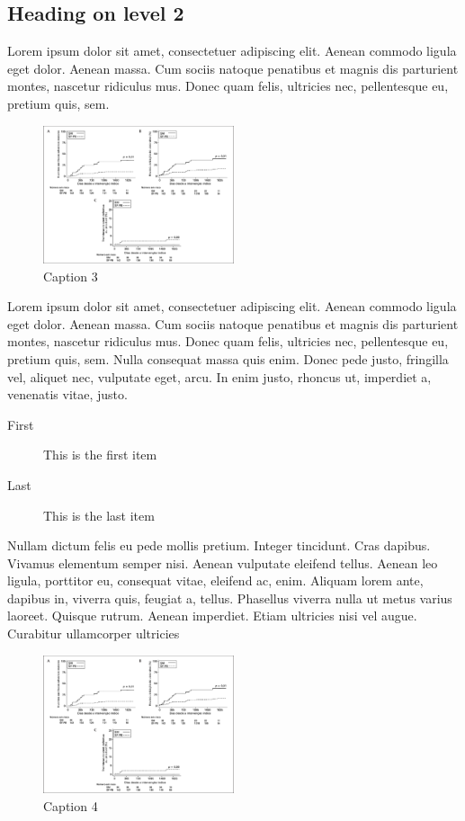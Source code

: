 \subsection*{Heading on level 2}
Lorem ipsum dolor sit amet, consectetuer adipiscing elit. Aenean commodo ligula
eget dolor. Aenean massa. Cum sociis natoque penatibus et magnis dis parturient
montes, nascetur ridiculus mus. Donec quam felis, ultricies nec, pellentesque
eu, pretium quis, sem. 

\par
\begin{figure}[p]
	\centering
	\includegraphics[width=0.5\textwidth]{temp.png}
	\caption{Caption 3}
	\label{Figura 3}
\end{figure}

Lorem ipsum dolor sit amet, consectetuer adipiscing elit. Aenean commodo ligula
eget dolor. Aenean massa. Cum sociis natoque penatibus et magnis dis parturient
montes, nascetur ridiculus mus. Donec quam felis, ultricies nec, pellentesque
eu, pretium quis, sem. Nulla consequat massa quis enim. Donec pede justo,
fringilla vel, aliquet nec, vulputate eget, arcu. In enim justo, rhoncus ut,
imperdiet a, venenatis vitae, justo. 
\begin{description}
	\item[First] This is the first item
	\item[Last] This is the last item
\end{description}
Nullam dictum felis eu pede mollis pretium. Integer tincidunt. Cras dapibus.
Vivamus elementum semper nisi. Aenean vulputate eleifend tellus. Aenean leo
ligula, porttitor eu, consequat vitae, eleifend ac, enim. Aliquam lorem ante,
dapibus in, viverra quis, feugiat a, tellus. Phasellus viverra nulla ut metus
varius laoreet. Quisque rutrum. Aenean imperdiet. Etiam ultricies nisi vel
augue. Curabitur ullamcorper ultricies 

\par
\begin{figure}[H]
	\centering
	\includegraphics[width=0.5\textwidth]{temp.png}
	\caption{Caption 4}
	\label{Figura 4}
\end{figure}

